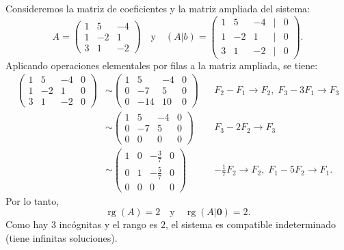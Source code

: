 \documentclass[12pt,a4]{aleph-examen}
\begin{document}
\begin{preguntas}
\begin{respuesta}
    Consideremos la matriz de coeficientes y la matriz ampliada del sistema:
    \[
        A=\begin{pmatrix}
            1 & 5 & -4\\
            1 & -2 & 1\\
            3 & 1 & -2
        \end{pmatrix}
        \quad\text{y}\quad
        (A|b)=\begin{pmatrix}
            1 & 5 & -4 & | & 0\\
            1 & -2 & 1 & | & 0\\
            3 & 1 & -2 & | & 0
        \end{pmatrix}.
    \]
    Aplicando operaciones elementales por filas a la matriz ampliada, se tiene:
    \begin{align*}
        \begin{pmatrix}
            1 & 5 & -4 & 0\\
            1 & -2 & 1 & 0\\
            3 & 1 & -2 & 0
        \end{pmatrix}
        &\sim
        \begin{pmatrix}
            1 & 5 & -4 & 0\\
            0 & -7 & 5 & 0\\
            0 & -14 & 10 & 0
        \end{pmatrix}
        && F_2-F_1\to F_2,\; F_3-3F_1\to F_3\\
        &\sim
        \begin{pmatrix}
            1 & 5 & -4 & 0\\
            0 & -7 & 5 & 0\\
            0 & 0 & 0 & 0
        \end{pmatrix}
        && F_3-2F_2\to F_3\\
        &\sim
        \begin{pmatrix}
            1 & 0 & -\frac{3}{7} & 0\\
            0 & 1 & -\frac{5}{7} & 0\\
            0 & 0 & 0 & 0
        \end{pmatrix}
        && -\tfrac{1}{7}F_2\to F_2,\; F_1-5F_2\to F_1.
    \end{align*}
    Por lo tanto,
    \[
        \operatorname{rg}(A)=2
        \quad\text{y}\quad
        \operatorname{rg}(A|\mathbf{0})=2.
    \]
    Como hay $3$ incógnitas y el rango es $2$, el sistema es compatible indeterminado (tiene infinitas soluciones).


\end{respuesta}
\end{preguntas}
\end{document}
